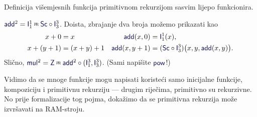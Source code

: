 Definicija višemjesnih funkcija primitivnom rekurzijom sasvim lijepo funkcionira.

\begin{primjer}[{name=[{zbrajanje, množenje i potenciranje primitivnom rekurzijom}]}]\label{pr:addmulpow}
$\f{add}^2=\f I_1^1\pr\f{Sc}\circ\f I_3^3$. Doista, zbrajanje dva broja možemo prikazati kao
\begin{align}
\label{eq:addb}
    x+0&=x & \f{add}(x,0)&=\f I_1^1(x),\\
\label{eq:addk}
    x+(y+1)&=(x+y)+1 &\f{add}(x,y+1)&=(\f{Sc}\circ\f I_3^3)\bigl(x,y,\f{add}(x,y)\bigr).
\end{align}
Slično, $\f{mul}^2=\f Z\pr\f{add}^2\circ(\f I_1^3,\f I_3^3)$. (Sami napišite $\f{pow}$!)
\end{primjer}

Vidimo da se mnoge funkcije mogu napisati koristeći samo inicijalne funkcije, kompoziciju i primitivnu rekurziju --- drugim riječima, primitivno su rekurzivne. No prije formalizacije tog pojma, dokažimo da se primitivna rekurzija može izvršavati na RAM-stroju.

